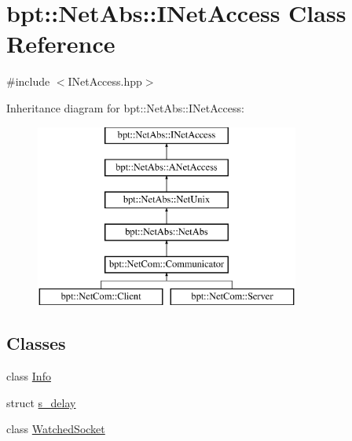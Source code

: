 \hypertarget{classbpt_1_1_net_abs_1_1_i_net_access}{\section{bpt\-:\-:Net\-Abs\-:\-:I\-Net\-Access Class Reference}
\label{classbpt_1_1_net_abs_1_1_i_net_access}
}


{\ttfamily \#include $<$I\-Net\-Access.\-hpp$>$}

Inheritance diagram for bpt\-:\-:Net\-Abs\-:\-:I\-Net\-Access\-:\begin{figure}[H]
\begin{center}
\leavevmode
\includegraphics[height=6.000000cm]{classbpt_1_1_net_abs_1_1_i_net_access}
\end{center}
\end{figure}
\subsection*{Classes}
\begin{DoxyCompactItemize}
\item 
class \hyperlink{classbpt_1_1_net_abs_1_1_i_net_access_1_1_info}{Info}
\item 
struct \hyperlink{structbpt_1_1_net_abs_1_1_i_net_access_1_1s__delay}{s\-\_\-delay}
\item 
class \hyperlink{classbpt_1_1_net_abs_1_1_i_net_access_1_1_watched_socket}{Watched\-Socket}
\end{DoxyCompactItemize}
